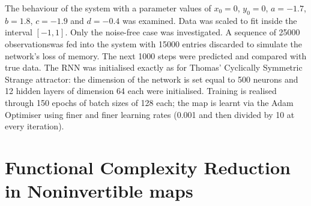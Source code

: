\documentclass[a4paper,12pt,twoside]{report}
\begin{document}
The behaviour of the system with a parameter values of $x_0=0$, $y_0=0$, $a = -1.7$,  $b = 1.8$, $c = -1.9$ and $d = -0.4$ was examined.
Data was scaled to fit inside the interval $[-1,1]$. Only the noise-free case was investigated. 
 A sequence of 25000 observationswas fed into the system with 15000 entries discarded to simulate the network's loss of memory. The next 1000 steps were predicted and compared with true data.
The RNN was initialised exactly as for Thomas' Cyclically Symmetric Strange attractor: the dimension of the network is set equal to 500 neurons and 12 hidden layers of dimension 64 each were initialised. Training is realised through 150 epochs of batch sizes of 128 each; the map is learnt via the Adam Optimiser using finer and finer learning rates (0.001 and then divided by 10 at every iteration).

\section{Functional Complexity Reduction in Noninvertible maps}



\end{document}

